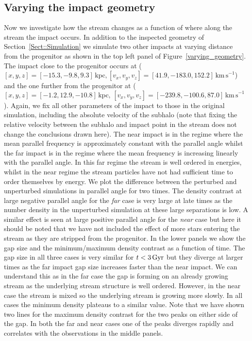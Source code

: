 \documentclass[useAMS,usenatbib,fleqn,a4paper]{mn2e}
\def\Gyr{\,{\rm Gyr}}
\begin{document}
\subsection{Varying the impact geometry}
Now we investigate how the stream changes as a function of where along the stream the impact occurs. In addition to the inspected geometry of Section~\ref{Sect::Simulation} we simulate two other impacts at varying distance from the progenitor as shown in the top left panel of Figure~\ref{varying_geometry}. The impact close to the progenitor occurs at ($[x,y,z]=[-15.3,-9.8,9.3]\,\mathrm{kpc},[v_x,v_y,v_z]=[41.9,-183.0,152.2]\,\mathrm{km\,s}^{-1}$) and the one further from the progenitor at ($[x,y,z]=[-1.2,12.9,-10.8]\,\mathrm{kpc},\,[v_x,v_y,v_z]=[-239.8,-100.6,87.0]\,\mathrm{km\,s}^{-1}$). Again, we fix all other parameters of the impact to those in the original simulation, including the absolute velocity of the subhalo (note that fixing the relative velocity between the subhalo and impact point in the stream does not change the conclusions drawn here). The near impact is in the regime where the mean parallel frequency is approximately constant with the parallel angle whilst the far impact is in the regime where the mean frequency is increasing linearly with the parallel angle. In this far regime the stream is well ordered in energies, whilst in the near regime the stream particles have not had sufficient time to order themselves by energy. We plot the difference between the perturbed and unperturbed simulations in parallel angle for two times. The density contrast at large negative parallel angle for the \emph{far} case is very large at late times as the number density in the unperturbed simulation at these large separations is low. A similar effect is seen at large positive parallel angle for the \emph{near} case but here it should be noted that we have not included the effect of more stars entering the stream as they are stripped from the progenitor. In the lower panels we show the gap size and the minimum/maximum density contrast as a function of time. The gap size in all three cases is very similar for $t<3\Gyr$ but they diverge at larger times as the far impact gap size increases faster than the near impact. We can understand this as in the far case the gap is forming on an already growing stream as the underlying stream structure is well ordered. However, in the near case the stream is mixed so the underlying stream is growing more slowly. In all cases the minimum density plateaus to a similar value. Note that we have shown two lines for the maximum density contrast for the two peaks on either side of the gap. In both the far and near cases one of the peaks diverges rapidly and correlates with the observations in the middle panels.
\end{document}
